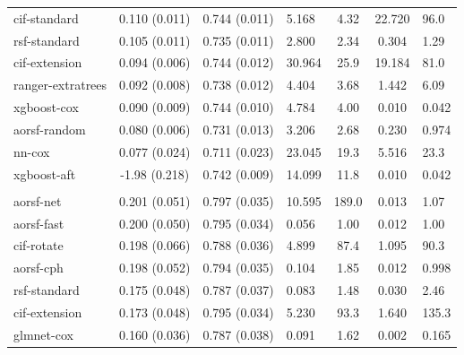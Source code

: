 \documentclass[twoside,11pt]{article}\usepackage[]{graphicx}\usepackage[]{xcolor}
\newenvironment{knitrout}{}{} %
\begin{document}
\begin{knitrout}
\begin{longtable}{lcclccl}
\hspace{1em}cif-standard & 0.110 (0.011) & 0.744 (0.011) & 5.168 & 4.32 & 22.720 & 96.0\\
\hspace{1em}rsf-standard & 0.105 (0.011) & 0.735 (0.011) & 2.800 & 2.34 & 0.304 & 1.29\\
\hspace{1em}cif-extension & 0.094 (0.006) & 0.744 (0.012) & 30.964 & 25.9 & 19.184 & 81.0\\
\hspace{1em}ranger-extratrees & 0.092 (0.008) & 0.738 (0.012) & 4.404 & 3.68 & 1.442 & 6.09\\
\hspace{1em}xgboost-cox & 0.090 (0.009) & 0.744 (0.010) & 4.784 & 4.00 & 0.010 & 0.042\\
\hspace{1em}aorsf-random & 0.080 (0.006) & 0.731 (0.013) & 3.206 & 2.68 & 0.230 & 0.974\\
\hspace{1em}nn-cox & 0.077 (0.024) & 0.711 (0.023) & 23.045 & 19.3 & 5.516 & 23.3\\
\hspace{1em}xgboost-aft & -1.98 (0.218) & 0.742 (0.009) & 14.099 & 11.8 & 0.010 & 0.042\\
\addlinespace[0.3em]
\hline
\multicolumn{7}{l}{\textit{\textbf{VA lung cancer trial; death, n = 137, p = 8}}}\\
\hline
\hspace{1em}aorsf-net & 0.201 (0.051) & 0.797 (0.035) & 10.595 & 189.0 & 0.013 & 1.07\\
\hspace{1em}aorsf-fast & 0.200 (0.050) & 0.795 (0.034) & 0.056 & 1.00 & 0.012 & 1.00\\
\hspace{1em}cif-rotate & 0.198 (0.066) & 0.788 (0.036) & 4.899 & 87.4 & 1.095 & 90.3\\
\hspace{1em}aorsf-cph & 0.198 (0.052) & 0.794 (0.035) & 0.104 & 1.85 & 0.012 & 0.998\\
\hspace{1em}rsf-standard & 0.175 (0.048) & 0.787 (0.037) & 0.083 & 1.48 & 0.030 & 2.46\\
\hspace{1em}cif-extension & 0.173 (0.048) & 0.795 (0.034) & 5.230 & 93.3 & 1.640 & 135.3\\
\hspace{1em}glmnet-cox & 0.160 (0.036) & 0.787 (0.038) & 0.091 & 1.62 & 0.002 & 0.165\\

\end{longtable}
\end{knitrout}
\end{document}
